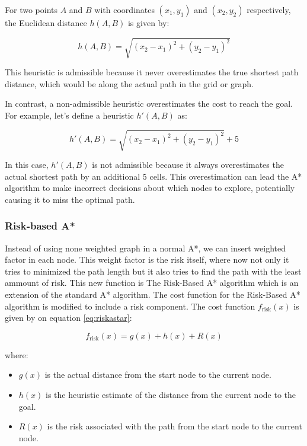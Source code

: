 \documentclass[12pt]{report}
\begin{document}
        For two points \(A\) and \(B\) with coordinates \((x_1, y_1)\) and \((x_2, y_2)\) respectively, the Euclidean
        distance \(h(A, B)\) is given by:

        \begin{equation}
            h(A, B) = \sqrt{(x_2 - x_1)^2 + (y_2 - y_1)^2}
        \end{equation}
            
        This heuristic is admissible because it never overestimates the true shortest path distance, which would be
        along the actual path in the grid or graph.
            
        In contrast, a non-admissible heuristic overestimates the cost to reach the goal. For example, let’s define a
        heuristic \(h'(A, B)\) as:
            
        \begin{equation}
            h'(A, B) = \sqrt{(x_2 - x_1)^2 + (y_2 - y_1)^2} + 5
        \end{equation}
            
        In this case, \(h'(A, B)\) is not admissible because it always overestimates the actual shortest path by an
        additional 5 cells. This overestimation can lead the A* algorithm to make incorrect decisions about which nodes
        to explore, potentially causing it to miss the optimal path.

        \subsubsection{Risk-based A*}
        Instead of using none weighted graph in a normal A*, we can insert weighted factor in each node. This weight
        factor is the risk itself, where now not only it tries to minimized the path length but it also tries to find
        the path with the least ammount of risk. This new function is The Risk-Based A* algorithm which is an extension
        of the standard A* algorithm. The cost function for the Risk-Based A* algorithm is modified to include a risk
        component. The cost function \( f_{\text{risk}}(x) \) is given by on equation \ref{eq:riskastar}:

        \begin{equation}\label{eq:riskastar}
        f_{\text{risk}}(x) = g(x) + h(x) + R(x)
        \end{equation}
        
        where:
        \begin{itemize}
          \item \( g(x) \) is the actual distance from the start node to the current node.
          \item \( h(x) \) is the heuristic estimate of the distance from the current node to the goal.
          \item \( R(x) \) is the risk associated with the path from the start node to the current node.
        \end{itemize}
        
\end{document}
